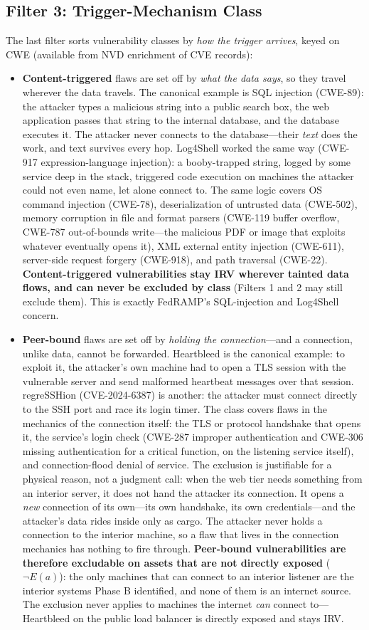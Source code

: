 \documentclass[11pt]{article}
\begin{document}
\subsection{Filter 3: Trigger-Mechanism Class}
The last filter sorts vulnerability classes by \emph{how the trigger arrives}, keyed on CWE (available from NVD enrichment of CVE records):
\begin{itemize}[leftmargin=1.5em]
\item \textbf{Content-triggered} flaws are set off by \emph{what the data says}, so they travel wherever the data travels. The canonical example is SQL injection (CWE-89): the attacker types a malicious string into a public search box, the web application passes that string to the internal database, and the database executes it. The attacker never connects to the database---their \emph{text} does the work, and text survives every hop. Log4Shell worked the same way (CWE-917 expression-language injection): a booby-trapped string, logged by some service deep in the stack, triggered code execution on machines the attacker could not even name, let alone connect to. The same logic covers OS command injection (CWE-78), deserialization of untrusted data (CWE-502), memory corruption in file and format parsers (CWE-119 buffer overflow, CWE-787 out-of-bounds write---the malicious PDF or image that exploits whatever eventually opens it), XML external entity injection (CWE-611), server-side request forgery (CWE-918), and path traversal (CWE-22). \textbf{Content-triggered vulnerabilities stay IRV wherever tainted data flows, and can never be excluded by class} (Filters 1 and 2 may still exclude them). This is exactly FedRAMP's SQL-injection and Log4Shell concern.
\item \textbf{Peer-bound} flaws are set off by \emph{holding the connection}---and a connection, unlike data, cannot be forwarded. Heartbleed is the canonical example: to exploit it, the attacker's own machine had to open a TLS session with the vulnerable server and send malformed heartbeat messages over that session. regreSSHion (CVE-2024-6387) is another: the attacker must connect directly to the SSH port and race its login timer. The class covers flaws in the mechanics of the connection itself: the TLS or protocol handshake that opens it, the service's login check (CWE-287 improper authentication and CWE-306 missing authentication for a critical function, on the listening service itself), and connection-flood denial of service. The exclusion is justifiable for a physical reason, not a judgment call: when the web tier needs something from an interior server, it does not hand the attacker its connection. It opens a \emph{new} connection of its own---its own handshake, its own credentials---and the attacker's data rides inside only as cargo. The attacker never holds a connection to the interior machine, so a flaw that lives in the connection mechanics has nothing to fire through. \textbf{Peer-bound vulnerabilities are therefore excludable on assets that are not directly exposed} ($\lnot E(a)$): the only machines that can connect to an interior listener are the interior systems Phase B identified, and none of them is an internet source. The exclusion never applies to machines the internet \emph{can} connect to---Heartbleed on the public load balancer is directly exposed and stays IRV.

\end{itemize}
\end{document}
